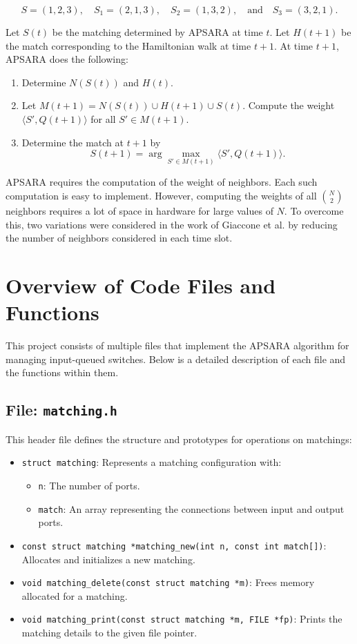 \documentclass[12pt	]{article}
\begin{document}
\[
S = (1, 2, 3), \quad S_1 = (2, 1, 3), \quad S_2 = (1, 3, 2), \quad \text{and} \quad S_3 = (3, 2, 1).
\]


Let $S(t)$ be the matching determined by APSARA at time $t$. Let $H(t + 1)$ be the match corresponding to the Hamiltonian walk at time $t + 1$. At time $t + 1$, APSARA does the following:

\begin{enumerate}
	\item Determine $N(S(t))$ and $H(t)$.
	\item Let $M(t + 1) = N(S(t)) \cup H(t + 1) \cup S(t)$. Compute the weight $\langle S', Q(t + 1) \rangle$ for all $S' \in M(t + 1)$.
	\item Determine the match at $t + 1$ by
	\[
	S(t + 1) = \arg \max_{S' \in M(t + 1)} \langle S', Q(t + 1) \rangle. \tag{7.8}
	\]
\end{enumerate}

APSARA requires the computation of the weight of neighbors. Each such computation is easy to implement. However, computing the weights of all $\binom{N}{2}$ neighbors requires a lot of space in hardware for large values of $N$. To overcome this, two variations were considered in the work of Giaccone et al. \cite{giaccone2002towards} by reducing the number of neighbors considered in each time slot.




\section{Overview of Code Files and Functions}

This project consists of multiple files that implement the APSARA algorithm for managing input-queued switches. Below is a detailed description of each file and the functions within them.

\subsection{File: \texttt{matching.h}}
This header file defines the structure and prototypes for operations on matchings:
\begin{itemize}
	\item \texttt{struct matching}: Represents a matching configuration with:
	\begin{itemize}
		\item \texttt{n}: The number of ports.
		\item \texttt{match}: An array representing the connections between input and output ports.
	\end{itemize}
	\item \texttt{const struct matching *matching\_new(int n, const int match[])}: Allocates and initializes a new matching.
	\item \texttt{void matching\_delete(const struct matching *m)}: Frees memory allocated for a matching.
	\item \texttt{void matching\_print(const struct matching *m, FILE *fp)}: Prints the matching details to the given file pointer.
\end{itemize}
\end{document}
